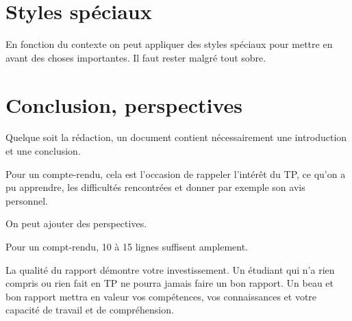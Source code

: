  
 

\section{Styles spéciaux}

En fonction du contexte on peut appliquer des styles spéciaux pour mettre en avant 
des choses importantes. Il faut rester malgré tout sobre.

  


 
  
  

\section{Conclusion, perspectives}

Quelque soit la rédaction, un document contient nécessairement une introduction et une conclusion.

Pour un compte-rendu, cela est l'occasion de rappeler l'intérêt du TP, ce qu'on a pu apprendre, les difficultés rencontrées et donner par exemple son avis personnel.

On peut ajouter des perspectives.

Pour un compt-rendu,   10 à 15 lignes suffisent amplement.


\vspace{1cm} 
 
La qualité du rapport démontre votre investissement. Un étudiant qui n'a rien compris ou rien fait en TP ne pourra jamais faire un bon rapport. 
Un beau et bon rapport mettra en valeur vos compétences, vos connaissances 
et votre capacité de travail et de compréhension. 
 
